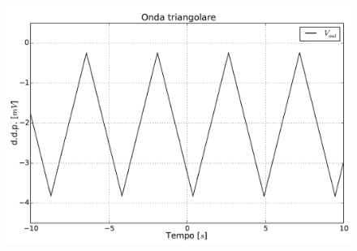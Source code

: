 \begin{figure}[htpc]
\centering
	\includegraphics[width=.65\textwidth]{../E12/latex/triangolare.pdf}
	\caption{}
	\label{fig12:triangolare}
\end{figure}